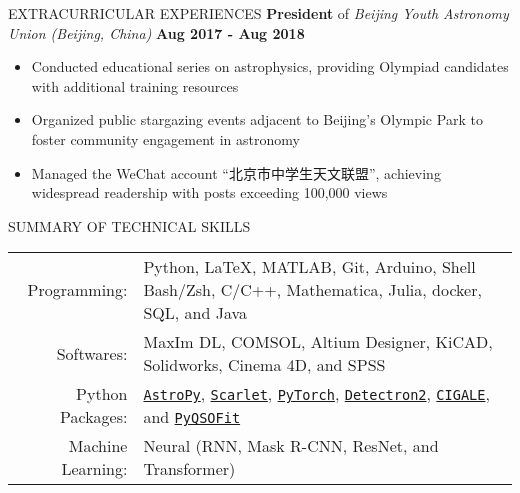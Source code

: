 \documentclass[10pt]{article} %
\begin{document}
\begin{section}{EXTRACURRICULAR EXPERIENCES}
\textbf{President} of \textit{Beijing Youth Astronomy Union (Beijing, China)} \hfill \textbf{Aug 2017 - Aug 2018} 
\begin{itemize}[leftmargin=1.5em]
    \item Conducted educational series on astrophysics, providing Olympiad candidates with additional training resources
    \item Organized public stargazing events adjacent to Beijing’s Olympic Park to foster community engagement in astronomy
    \item Managed the WeChat account ``北京市中学生天文联盟'', achieving widespread readership with posts exceeding 100,000 views
\end{itemize}

\end{section}

\begin{section}{SUMMARY OF TECHNICAL SKILLS}

    \begin{tabular}{rl}
        Programming: & Python, \LaTeX, MATLAB, Git, Arduino, Shell Bash/Zsh, C/C++, Mathematica, Julia, docker, SQL, and Java \\
        Softwares: & MaxIm DL, COMSOL, Altium Designer, KiCAD, Solidworks, Cinema 4D, and SPSS \\
        Python Packages: & \href{https://www.astropy.org/}{\texttt{AstroPy}}, \href{https://github.com/pmelchior/scarlet}{\texttt{Scarlet}}, \href{https://pytorch.org/}{\texttt{PyTorch}}, \href{https://github.com/facebookresearch/detectron2}{\texttt{Detectron2}}, \href{https://cigale.lam.fr/}{\texttt{CIGALE}}, and \href{https://github.com/legolason/PyQSOFit}{\texttt{PyQSOFit}} \\
        Machine Learning: & Neural (RNN, Mask R-CNN, ResNet, and Transformer) \\
    \end{tabular}
    
    \end{section} 
\end{document}
